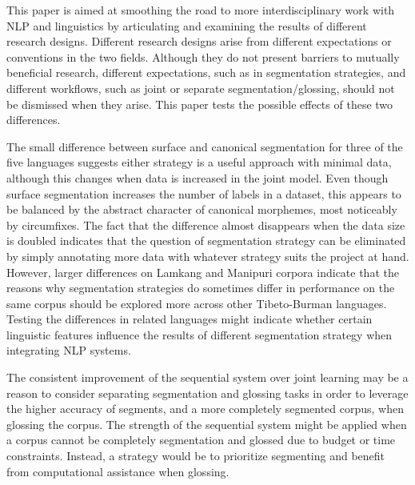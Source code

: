 This paper is aimed at smoothing the road to more interdisciplinary work with NLP and linguistics by articulating and examining the results of different research designs. Different research designs arise from different expectations or conventions in the two fields. Although they do not present barriers to mutually beneficial research, different expectations, such as in segmentation strategies, and different workflows, such as joint or separate segmentation/glossing, should not be dismissed when they arise. This paper tests the possible effects of these two differences.

The small difference between surface and canonical segmentation for three of the five languages suggests either strategy is a useful approach with minimal data, although this changes when data is increased in the joint model. Even though surface segmentation increases the number of labels in a dataset, this appears to be balanced by the abstract character of canonical morphemes, most noticeably by circumfixes. The fact that the difference almost disappears when the data size is doubled indicates that the question of segmentation strategy can be eliminated by simply annotating more data with whatever strategy suits the project at hand. 
However, larger differences on Lamkang and Manipuri corpora indicate that the reasons why segmentation strategies do sometimes differ in performance on the same corpus should be explored more across other Tibeto-Burman languages. Testing the differences in related languages might indicate whether certain linguistic features influence the results of different segmentation strategy when integrating NLP systems. 

The consistent improvement of the sequential system over joint learning may be a reason to consider separating segmentation and glossing tasks in order to leverage the higher accuracy of segments, and a more completely segmented corpus, when glossing the corpus. 
The strength of the sequential system might be applied when a corpus cannot be completely segmentation and glossed due to budget or time constraints. Instead, a strategy would be to prioritize segmenting and benefit from computational assistance when glossing. 

